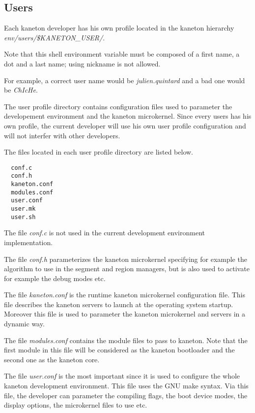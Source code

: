 %
%

\subsection{Users}

Each kaneton developer has his own profile located in the kaneton
hierarchy \textit{env/users/\$KANETON\_USER/}.

Note that this shell environment variable must be composed of a
first name, a dot and a last name; using nickname is not allowed.

For example, a correct user name would be \textit{julien.quintard} and
a bad one would be \textit{ChIcHe}.

The user profile directory contains configuration files used to parameter
the developement environment and the kaneton microkernel. Since every
users has his own profile, the current developer will use his own user
profile configuration and will not interfer with other developers.

The files located in each user profile directory are listed below.

\begin{verbatim}
  conf.c
  conf.h
  kaneton.conf
  modules.conf
  user.conf
  user.mk
  user.sh
\end{verbatim}

The file \textit{conf.c} is not used in the current development environment
implementation.

The file \textit{conf.h} parameterizes the kaneton microkernel specifying
for example the algorithm to use in the segment and region managers,
but is also used to activate for example the debug modes etc.

The file \textit{kaneton.conf} is the runtime kaneton microkernel
configuration file. This file describes the kaneton servers to launch
at the operating system startup. Moreover this file is used to parameter
the kaneton microkernel and servers in a dynamic way.

The file \textit{modules.conf} contains the module files to pass to
kaneton. Note that the first module in this file will be considered as
the kaneton bootloader and the second one as the kaneton core.

The file \textit{user.conf} is the most important since it is used
to configure the whole kaneton development environment. This file uses
the GNU make syntax. Via this file, the developer can parameter the compiling
flags, the boot device modes, the display options, the microkernel
files to use etc.

